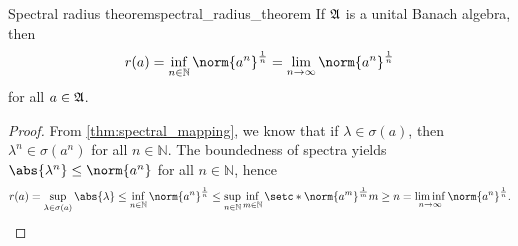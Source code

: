 \begin{theorem}{Spectral radius theorem}{spectral_radius_theorem}
    If \(\mathfrak{A}\) is a unital Banach algebra, then
    \begin{equation*}
        r(a) = \inf_{n\in \mathbb{N}}{\norm{a^n}^{\frac{1}{n}}}= \lim_{n\to\infty}{\norm{a^n}^{\frac1n}}
    \end{equation*}
    for all \(a \in \mathfrak{A}\).
\end{theorem}
\begin{proof}
    From \cref{thm:spectral_mapping}, we know that if \(\lambda \in \sigma(a)\), then \(\lambda^n \in \sigma(a^n)\) for all \(n \in \mathbb{N}\). The boundedness of spectra yields \(\abs{\lambda^n} \leq \norm{a^n}\) for all \(n \in \mathbb{N}\), hence
    \begin{equation*}
        r(a) = \sup_{\lambda \in \sigma(a)}{\abs{\lambda}}\leq\inf_{n\in \mathbb{N}}{\norm{a^n}^{\frac1n}} \leq \sup_{n \in \mathbb{N}}{\inf_{m \in \mathbb{N}}{\setc*{\norm{a^m}^{\frac1m}}{m \geq n}}} = \liminf_{n\to\infty}{\norm{a^n}^{\frac1n}}.
    \end{equation*}


\end{proof}
